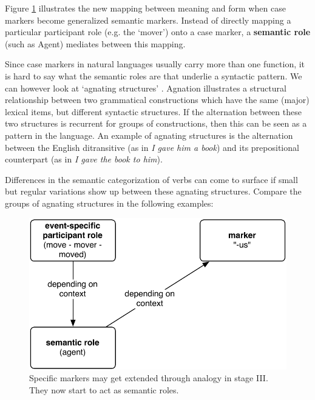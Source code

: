 Figure \ref{f:stage3} illustrates the new mapping between meaning and form when case markers become generalized semantic markers. Instead of directly mapping a particular participant role (e.g. the `mover') onto a case marker, a {\bfseries semantic role} (such as Agent) mediates between this mapping.

Since case markers in natural languages usually carry more than one function, it is hard to say what the semantic roles are that underlie a syntactic pattern. We can however look at `agnating structures' \citep{gleason65linguistics}. Agnation illustrates a structural relationship between two grammatical constructions which have the same (major) lexical items, but different syntactic structures. If the alternation between these two structures is recurrent for groups of constructions, then this can be seen as a pattern in the language. An example of agnating structures is the alternation between the English ditransitive (as in {\em I gave him a book}) and its prepositional counterpart (as in {\em I gave the book to him}). 

Differences in the semantic categorization of verbs can come to surface if small but regular variations show up between these agnating structures. Compare the groups of agnating structures in the following examples:

\begin{figure}[t]
\centerline{\includegraphics[scale=0.6]{chap-introduction/figs/stage3}}
  \caption[Formation of case markers: stage III]{Specific markers may get extended through analogy in stage III. They now start to act as semantic roles.}
   \label{f:stage3}
\end{figure}

